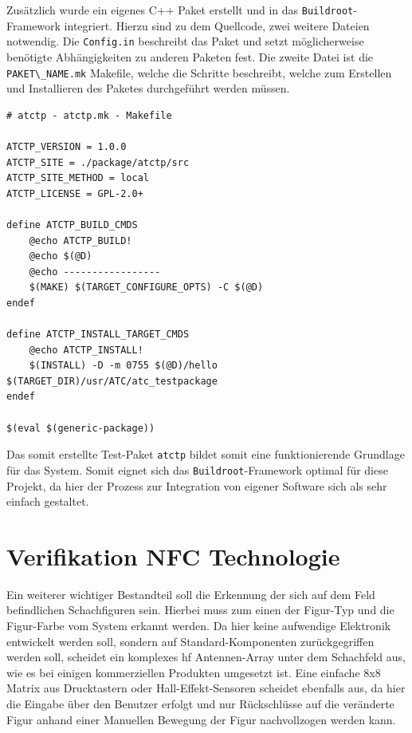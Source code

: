Zusätzlich wurde ein eigenes C++ Paket erstellt und in das
\passthrough{\lstinline!Buildroot!}-Framework integriert. Hierzu sind zu
dem Quellcode, zwei weitere Dateien notwendig. Die
\passthrough{\lstinline!Config.in!} beschreibt das Paket und setzt
möglicherweise benötigte Abhängigkeiten zu anderen Paketen fest. Die
zweite Datei ist die \passthrough{\lstinline!PAKET\_NAME.mk!} Makefile,
welche die Schritte beschreibt, welche zum Erstellen und Installieren
des Paketes durchgeführt werden müssen.

\begin{lstlisting}
# atctp - atctp.mk - Makefile

ATCTP_VERSION = 1.0.0
ATCTP_SITE = ./package/atctp/src
ATCTP_SITE_METHOD = local
ATCTP_LICENSE = GPL-2.0+

define ATCTP_BUILD_CMDS
    @echo ATCTP_BUILD!
    @echo $(@D)
    @echo -----------------
    $(MAKE) $(TARGET_CONFIGURE_OPTS) -C $(@D)
endef

define ATCTP_INSTALL_TARGET_CMDS
    @echo ATCTP_INSTALL!
    $(INSTALL) -D -m 0755 $(@D)/hello $(TARGET_DIR)/usr/ATC/atc_testpackage
endef

$(eval $(generic-package))
\end{lstlisting}

Das somit erstellte Test-Paket \passthrough{\lstinline!atctp!} bildet
somit eine funktionierende Grundlage für das System. Somit eignet sich
das \passthrough{\lstinline!Buildroot!}-Framework optimal für diese
Projekt, da hier der Prozess zur Integration von eigener Software sich
als sehr einfach gestaltet.

\hypertarget{verifikation-nfc-technologie}{%
\section{Verifikation NFC
Technologie}\label{verifikation-nfc-technologie}}

Ein weiterer wichtiger Bestandteil soll die Erkennung der sich auf dem
Feld befindlichen Schachfiguren sein. Hierbei muss zum einen der
Figur-Typ und die Figur-Farbe vom System erkannt werden. Da hier keine
aufwendige Elektronik entwickelt werden soll, sondern auf
Standard-Komponenten zurückgegriffen werden soll, scheidet ein komplexes
\gls{hf} Antennen-Array unter dem Schachfeld aus, wie es bei einigen
kommerziellen Produkten umgesetzt ist. Eine einfache 8x8 Matrix aus
Drucktastern oder Hall-Effekt-Sensoren scheidet ebenfalls aus, da hier
die Eingabe über den Benutzer erfolgt und nur Rückschlüsse auf die
veränderte Figur anhand einer Manuellen Bewegung der Figur nachvollzogen
werden kann.

